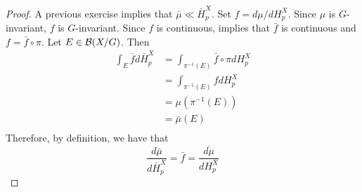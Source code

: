 \documentclass{book}
\begin{document}
	\begin{proof}
	A previous exercise implies that $\bar{\mu} \ll \bar{H}_p^X$. Set $f = d \mu /d H_p^X$. Since $\mu$ is $G$-invariant, $f$ is $G$-invariant. Since $f$ is continuous,  implies that $\bar{f}$ is continuous and $f = \bar{f} \circ \pi$. Let $E \in \mathcal{B}(X/G)$. Then 
	\begin{align*}
	\int_E \bar{f} d \bar{H}_p^X 
	&= \int_{\pi^{-1}(E)} \bar{f} \circ \pi dH_p^X \\
	&= \int_{\pi^{-1}(E)} f dH_p^X \\
	&= \mu(\pi^{-1}(E)) \\
	&= \bar{\mu}(E) \\
\end{align*}	 
	Therefore, by definition, we have that
	\begin{equation*}
	\frac{d \bar{\mu}}{d \bar{H}_p^X} = \bar{f} = \overline{\frac{d \mu}{d H_p^X}}
	\end{equation*}
	\end{proof}
	
	
	
	
	
	
	
	
	
	
	
	
	
	
	
	
	
	
	
	
	
	
	
	
	
	

	
	
	
	
	
	
	
	
	
	
	
	
	
	
	
	
	
	
	
	
	
	
\end{document}
